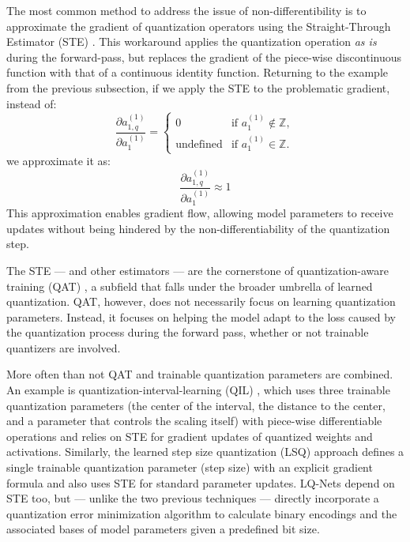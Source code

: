 \hspace*{1em}The most common method to address the issue of non-differentibility is to approximate the gradient of quantization operators
using the Straight-Through Estimator (STE) \cite{bengio2013estimating, fan2021training, DBLP:conf/eccv/ZhangYYH18}. 
This workaround applies the quantization operation \textit{as is} 
during the forward-pass, but replaces the gradient of the piece-wise discontinuous function 
with that of a continuous identity function. Returning to the example from the previous subsection,
if we apply the STE to the problematic gradient, instead of:
\[
  \frac{\partial a_{1,q}^{(1)}}{\partial a_{1}^{(1)}} =
  \begin{cases} 
      0 & \text{if } a_{1}^{(1)} \notin \mathbb{Z}, \\
      \text{undefined} & \text{if } a_{1}^{(1)} \in \mathbb{Z}.
  \end{cases}
  \]
we approximate it as: 
\[
  \frac{\partial a_{1,q}^{(1)}}{\partial a_{1}^{(1)}}  \approx 1
  \]
This approximation enables gradient flow, allowing model parameters to receive updates
without being hindered by the non-differentiability of the quantization step.

The STE — and other estimators \cite{DBLP:journals/jstsp/Chen0ZHY20} —  are the cornerstone of quantization-aware training (QAT) \cite{jacob2018quantization},
a subfield that falls under the broader umbrella of learned quantization.
QAT, however, does not necessarily focus on learning quantization parameters.
Instead, it focuses on helping the model adapt to the loss caused by the quantization process during the forward pass,
whether or not trainable quantizers are involved.

More often than not QAT and trainable quantization parameters are combined. 
An example is quantization-interval-learning (QIL) \cite{DBLP:conf/cvpr/JungSLSHKHC19}, 
which uses three trainable quantization parameters 
(the center of the interval, the distance to the center, and a parameter that controls the scaling itself) 
with piece-wise differentiable operations and relies on STE for gradient updates of quantized weights and activations. 
Similarly, the learned step size quantization (LSQ) approach \cite{DBLP:conf/iclr/EsserMBAM20} 
defines a single trainable quantization parameter (step size) with an explicit gradient formula and also uses STE for standard parameter updates.
LQ-Nets \cite{DBLP:conf/eccv/ZhangYYH18} depend on STE too, but  —  unlike the two previous techniques — 
directly incorporate a quantization error minimization algorithm to calculate binary encodings and the associated bases of
model parameters given a predefined bit size. 

